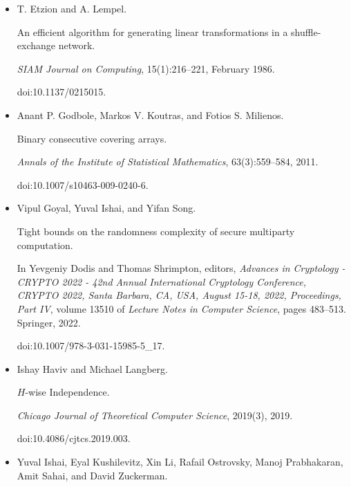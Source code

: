 \documentclass[10pt,a4paper]{article}
\begin{document}
\begin{itemize}
\item[] 
[5]

T. Etzion and A. Lempel.


An efficient algorithm for generating linear transformations in a
shuffle-exchange network.


\emph{SIAM Journal on Computing}, 15(1):216–221, February 1986.


doi:10.1137/0215015.





\item[] 
[6]

Anant P. Godbole, Markos V. Koutras, and Fotios S. Milienos.


Binary consecutive covering arrays.


\emph{Annals of the Institute of Statistical Mathematics},
63(3):559–584, 2011.


doi:10.1007/s10463-009-0240-6.





\item[] 
[7]

Vipul Goyal, Yuval Ishai, and Yifan Song.


Tight bounds on the randomness complexity of secure multiparty
computation.


In Yevgeniy Dodis and Thomas Shrimpton, editors, \emph{Advances in
Cryptology - CRYPTO 2022 - 42nd Annual International Cryptology Conference,
CRYPTO 2022, Santa Barbara, CA, USA, August 15-18, 2022, Proceedings, Part
IV}, volume 13510 of \emph{Lecture Notes in Computer Science}, pages
483–513. Springer, 2022.


doi:10.1007/978-3-031-15985-5\_17.





\item[] 
[8]

Ishay Haviv and Michael Langberg.


$H$-wise Independence.


\emph{Chicago Journal of Theoretical Computer Science}, 2019(3), 2019.


doi:10.4086/cjtcs.2019.003.





\item[] 
[9]

Yuval Ishai, Eyal Kushilevitz, Xin Li, Rafail Ostrovsky, Manoj Prabhakaran,
Amit Sahai, and David Zuckerman.



\end{itemize}
\end{document}
